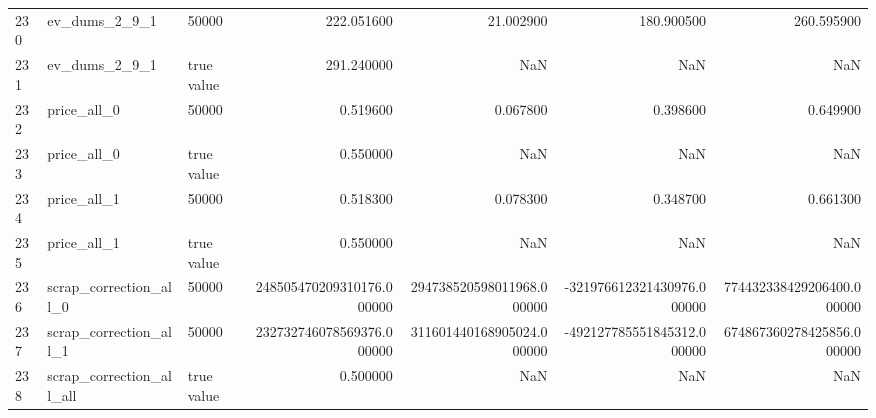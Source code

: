 \begin{tabular}{lllrrrr}
230 & ev_dums_2_9_1 & 50000 & 222.051600 & 21.002900 & 180.900500 & 260.595900 \\
231 & ev_dums_2_9_1 & true value & 291.240000 & NaN & NaN & NaN \\
232 & price_all_0 & 50000 & 0.519600 & 0.067800 & 0.398600 & 0.649900 \\
233 & price_all_0 & true value & 0.550000 & NaN & NaN & NaN \\
234 & price_all_1 & 50000 & 0.518300 & 0.078300 & 0.348700 & 0.661300 \\
235 & price_all_1 & true value & 0.550000 & NaN & NaN & NaN \\
236 & scrap_correction_all_0 & 50000 & 248505470209310176.000000 & 294738520598011968.000000 & -321976612321430976.000000 & 774432338429206400.000000 \\
237 & scrap_correction_all_1 & 50000 & 232732746078569376.000000 & 311601440168905024.000000 & -492127785551845312.000000 & 674867360278425856.000000 \\
238 & scrap_correction_all_all & true value & 0.500000 & NaN & NaN & NaN \\
\bottomrule
\end{tabular}
